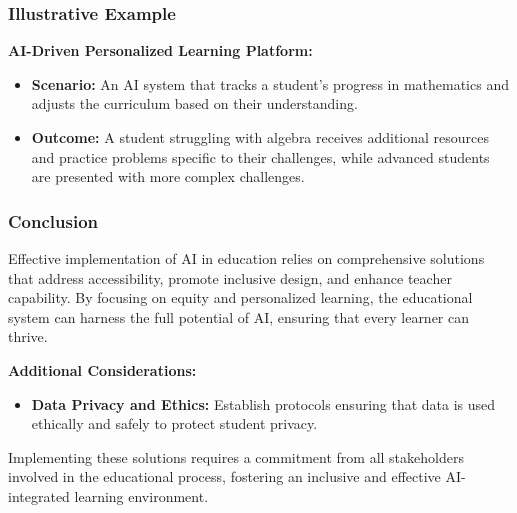 \documentclass[aspectratio=169]{beamer}
\begin{document}
\begin{frame}[fragile]
    \frametitle{Illustrative Example}
    \textbf{AI-Driven Personalized Learning Platform:}
    \begin{itemize}
        \item \textbf{Scenario:} An AI system that tracks a student's progress in mathematics and adjusts the curriculum based on their understanding.
        \item \textbf{Outcome:} A student struggling with algebra receives additional resources and practice problems specific to their challenges, while advanced students are presented with more complex challenges.
    \end{itemize}
\end{frame}

\begin{frame}[fragile]
    \frametitle{Conclusion}
    Effective implementation of AI in education relies on comprehensive solutions that address accessibility, promote inclusive design, and enhance teacher capability. By focusing on equity and personalized learning, the educational system can harness the full potential of AI, ensuring that every learner can thrive.
    
    \textbf{Additional Considerations:}
    \begin{itemize}
        \item \textbf{Data Privacy and Ethics:} Establish protocols ensuring that data is used ethically and safely to protect student privacy.
    \end{itemize}
    
    Implementing these solutions requires a commitment from all stakeholders involved in the educational process, fostering an inclusive and effective AI-integrated learning environment.
\end{frame}
\end{document}

